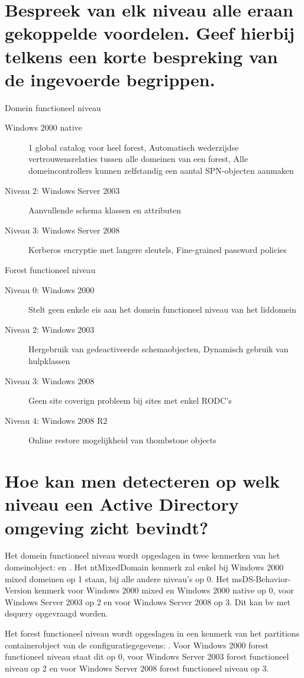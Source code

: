 \section{Bespreek van elk niveau alle eraan gekoppelde voordelen. Geef hierbij
telkens een korte bespreking van de ingevoerde begrippen.}

Domein functioneel niveau
\begin{description}
	\item[Windows 2000 native] 1 global catalog voor heel forest,
		Automatisch wederzijdse vertrouwensrelaties tussen alle domeinen
		van een forest, Alle domeincontrollers kunnen zelfstandig een
		aantal SPN-objecten aanmaken
	\item[Niveau 2: Windows Server 2003] Aanvullende schema klassen en
		attributen
	\item[Niveau 3: Windows Server 2008] Kerberos encryptie met langere
		sleutels, Fine-grained password policies
\end{description}

Forest functioneel niveau
\begin{description}
	\item[Niveau 0: Windows 2000] Stelt geen enkele eis aan het domein
		functioneel niveau van het liddomein
	\item[Niveau 2: Windows 2003] Hergebruik van gedeactiveerde
		schemaobjecten, Dynamisch gebruik van hulpklassen
	\item[Niveau 3: Windows 2008] Geen site coverign probleem bij sites met
		enkel RODC's
	\item[Niveau 4: Windows 2008 R2] Online restore mogelijkheid van
		thombstone objects
\end{description}

\section{Hoe kan men detecteren op welk niveau een Active Directory omgeving
zicht bevindt?}

Het domein functioneel niveau wordt opgeslagen in twee kenmerken van het
domeinobject:  en . Het
ntMixedDomain kenmerk zal enkel bij Windows 2000 mixed domeinen op 1 staan, bij
alle andere niveau's op 0. Het msDS-Behavior-Version kenmerk voor Windows 2000
mixed en Windows 2000 native op 0, voor Windows Server 2003 op 2 en voor Windows
Server 2008 op 3. Dit kan bv met dsquery opgevraagd worden.

Het forest functioneel niveau wordt opgeslagen in een kenmerk van het partitions
containerobject van de configuratiegegevens: .
Voor Windows 2000 forest functioneel niveau staat dit op 0, voor Windows Server
2003 forest functioneel niveau op 2 en voor Windows Server 2008 forest
functioneel niveau op 3.

